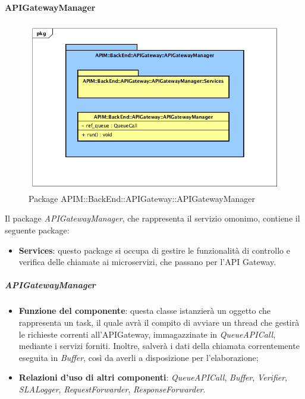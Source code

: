 \paragraph{APIGatewayManager}
\begin{figure}[H]
	\centering
	\includegraphics[scale=0.45]{UML/DiagrammiPackage/APIGatewayManager.png}
	\caption{Package APIM::BackEnd::APIGateway::APIGatewayManager}
\end{figure}

Il package \textit{APIGatewayManager}, che rappresenta il servizio omonimo, contiene il seguente package:
\begin{itemize}
	\item \textbf{Services}: questo package si occupa di gestire le funzionalità di controllo e verifica delle chiamate ai microservizi, che passano per l'API Gateway.
\end{itemize}

\subparagraph{APIGatewayManager}
\begin{itemize}
	\item \textbf{Funzione del componente}: questa classe istanzier\`{a} un oggetto che rappresenta un task, il quale avr\`{a} il compito di avviare un thread che gestir\`{a} le richieste correnti all'APIGateway, immagazzinate in \textit{QueueAPICall}, mediante i servizi forniti. Inoltre, salverà i dati della chiamata correntemente eseguita in \textit{Buffer}, così da averli a disposizione per l'elaborazione;
	\item \textbf{Relazioni d'uso di altri componenti}: \textit{QueueAPICall}, \textit{Buffer}, \textit{Verifier}, \textit{SLALogger}, \textit{RequestForwarder}, \textit{ResponseForwarder}.
\end{itemize}

